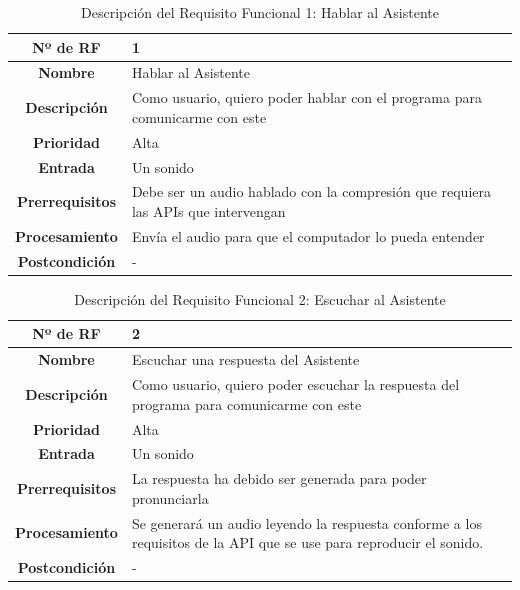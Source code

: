 \begin{table}[H]
	\centering
	\begin{tabularx}{\textwidth}{|c|X|} 
		\hline
		\textbf{Nº de RF }          &  1 \\ 
		\hline
		\textbf{Nombre}         &  Hablar al Asistente \\ 
		\hline
		\textbf{Descripción}    &  Como usuario, quiero poder hablar con el programa para comunicarme con este \\ 
		\hline
		\textbf{Prioridad}      &  Alta  \\ 
		\hline
		\textbf{Entrada}        & Un sonido  \\ 
		\hline
		\textbf{Prerrequisitos} & Debe ser un audio hablado con la compresión que requiera las APIs que intervengan  \\ 
		\hline
		\textbf{Procesamiento}  &  Envía el audio para que el computador lo pueda entender \\ 
		\hline
		\textbf{Postcondición}  &  - \\
		\hline
	\end{tabularx}
	\caption{Descripción del Requisito Funcional 1: Hablar al Asistente}
\end{table}

\begin{table}[H]
	\centering
	\begin{tabularx}{\textwidth}{|c|X|} 
		\hline
		\textbf{Nº de RF }          &  2 \\ 
		\hline
		\textbf{Nombre}         &  Escuchar una respuesta del Asistente \\ 
		\hline
		\textbf{Descripción}    &  Como usuario, quiero poder escuchar la respuesta del programa para comunicarme con este \\ 
		\hline
		\textbf{Prioridad}      &  Alta  \\ 
		\hline
		\textbf{Entrada}        & Un sonido  \\ 
		\hline
		\textbf{Prerrequisitos} & La respuesta ha debido ser generada para poder pronunciarla \\ 
		\hline
		\textbf{Procesamiento}  &  Se generará un audio leyendo la respuesta conforme a los requisitos de la API que se use para reproducir el sonido. \\ 
		\hline
		\textbf{Postcondición}  &  - \\
		\hline
	\end{tabularx}
	\caption{Descripción del Requisito Funcional 2: Escuchar al Asistente}
\end{table}


